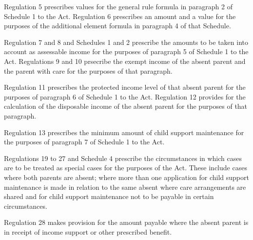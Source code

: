 \documentclass[12pt,a4paper]{article}
\begin{document}
Regulation 5 prescribes values for the general rule formula in paragraph 2 of Schedule 1 to the Act. Regulation 6 prescribes an amount and a value for the purposes of the additional element formula in paragraph 4 of that Schedule.

Regulation 7 and 8 and Schedules 1 and 2 prescribe the amounts to be taken into account as assessable income for the purposes of paragraph 5 of Schedule 1 to the Act. Regulations 9 and 10 prsecribe the exempt income of the absent parent and the parent with care for the purposes of that paragraph.

Regulation 11 prescribes the protected income level of that absent parent for the purposes of paragraph 6 of Schedule 1 to the Act. Regulation 12 provides for the calculation of the disposable income of the absent parent for the purposes of that paragraph.

Regulation 13 prescribes the minimum amount of child support maintenance for the purposes of paragraph 7 of Schedule 1 to the Act.

Regulations 19 to 27 and Schedule 4 prescribe the circumstances in which cases are to be treated as special cases for the purposes of the Act. These include cases where both parents are absent; where more than one application for child support maintenance is made in relation to the same absent where care arrangements are shared and for child support maintenance not to be payable in certain circumstances.

Regulation 28 makes provision for the amount payable where the absent parent is in receipt of income support or other prescribed benefit. 
\end{document}
